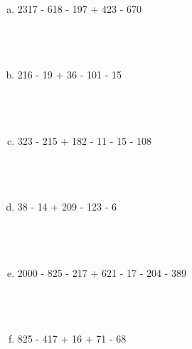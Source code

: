 \documentclass[a4paper,14pt]{article}
\begin{document}
\begin{multicols}{2}
\begin{enumerate}
\begin{enumerate}[a)]
    				\item 2317 - 618 - 197 + 423 - 670 \\\\\\\\
    				\item 216 - 19 + 36 - 101 - 15 \\\\\\\\
    				\item 323 - 215 + 182 - 11 - 15 - 108 \\\\\\\\
    				\item 38 - 14 + 209 - 123 - 6 \\\\\\\\
    				\item 2000 - 825 - 217 + 621 - 17 - 204 - 389 \\\\\\\\
    				\item 825 - 417 + 16 + 71 - 68 \\\\\\\\
    			\end{enumerate}
        	\end{enumerate}

\end{multicols}
\end{document}
